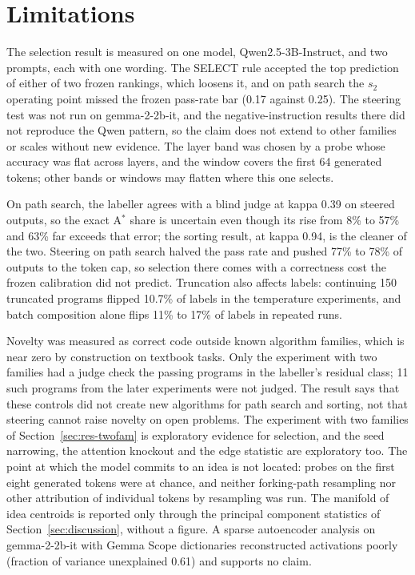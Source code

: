 \documentclass[11pt,letterpaper]{article}
\newcommand{\Astar}{A$^{*}$}
\begin{document}
\section{Limitations}
\label{sec:limitations}

The selection result is measured on one model, Qwen2.5-3B-Instruct, and two prompts, each with one wording. The SELECT rule accepted the top prediction of either of two frozen rankings, which loosens it, and on path search the $s_2$ operating point missed the frozen pass-rate bar (0.17 against 0.25). The steering test was not run on gemma-2-2b-it, and the negative-instruction results there did not reproduce the Qwen pattern, so the claim does not extend to other families or scales without new evidence. The layer band was chosen by a probe whose accuracy was flat across layers, and the window covers the first 64 generated tokens; other bands or windows may flatten where this one selects.

On path search, the labeller agrees with a blind judge at kappa 0.39 on steered outputs, so the exact \Astar{} share is uncertain even though its rise from 8\% to 57\% and 63\% far exceeds that error; the sorting result, at kappa 0.94, is the cleaner of the two. Steering on path search halved the pass rate and pushed 77\% to 78\% of outputs to the token cap, so selection there comes with a correctness cost the frozen calibration did not predict. Truncation also affects labels: continuing 150 truncated programs flipped 10.7\% of labels in the temperature experiments, and batch composition alone flips 11\% to 17\% of labels in repeated runs.

Novelty was measured as correct code outside known algorithm families, which is near zero by construction on textbook tasks. Only the experiment with two families had a judge check the passing programs in the labeller's residual class; 11 such programs from the later experiments were not judged. The result says that these controls did not create new algorithms for path search and sorting, not that steering cannot raise novelty on open problems. The experiment with two families of Section~\ref{sec:res-twofam} is exploratory evidence for selection, and the seed narrowing, the attention knockout and the edge statistic are exploratory too. The point at which the model commits to an idea is not located: probes on the first eight generated tokens were at chance, and neither forking-path resampling \citep{Bigelow2024} nor other attribution of individual tokens by resampling was run. The manifold of idea centroids is reported only through the principal component statistics of Section~\ref{sec:discussion}, without a figure. A sparse autoencoder analysis on gemma-2-2b-it with Gemma Scope dictionaries \citep{Lieberum2024} reconstructed activations poorly (fraction of variance unexplained 0.61) and supports no claim.
\end{document}
